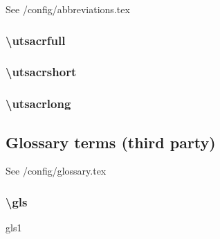 See /config/abbreviations.tex

\subsubsection{\textbackslash utsacrfull}


\subsubsection{\textbackslash utsacrshort}

\subsubsection{\textbackslash utsacrlong}


\subsection{Glossary terms (third party)}
See /config/glossary.tex
\subsubsection{\textbackslash gls}
\gls{gls1}
\\
\\
